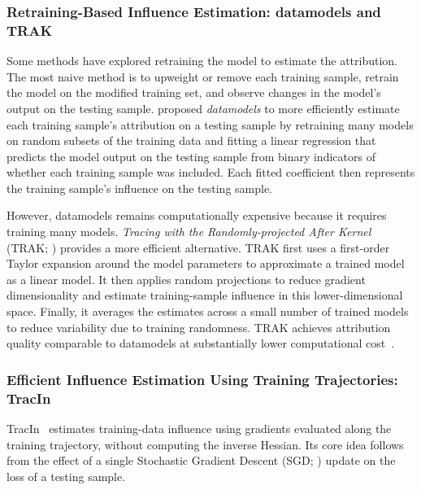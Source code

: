 \subsubsection{Retraining-Based Influence Estimation: datamodels and TRAK}
\label{sec:trak}

Some methods have explored retraining the model to estimate the attribution. The most naive method is to upweight or remove each training sample, retrain the model on the modified training set, and observe changes in the model's output on the testing sample.  proposed \emph{datamodels} to more efficiently estimate each training sample's attribution on a testing sample by retraining many models on random subsets of the training data and fitting a linear regression that predicts the model output on the testing sample from binary indicators of whether each training sample was included. Each fitted coefficient then represents the training sample's influence on the testing sample.

However, datamodels remains computationally expensive because it requires training many models. \emph{Tracing with the Randomly-projected After Kernel} (TRAK; ) provides a more efficient alternative. TRAK first uses a first-order Taylor expansion around the model parameters to approximate a trained model as a linear model. It then applies random projections to reduce gradient dimensionality and estimate training-sample influence in this lower-dimensional space. Finally, it averages the estimates across a small number of trained models to reduce variability due to training randomness. TRAK achieves attribution quality comparable to datamodels at substantially lower computational cost~.

\subsubsection{Efficient Influence Estimation Using Training Trajectories: TracIn}
\label{sec:tracin}

TracIn~ estimates training-data influence using gradients evaluated along the training trajectory, without computing the inverse Hessian. Its core idea follows from the effect of a single Stochastic Gradient Descent (SGD; ) update on the loss of a testing sample.

